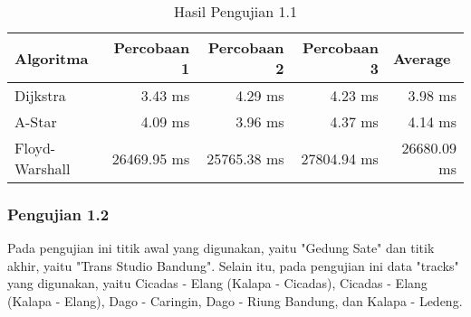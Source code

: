 \renewcommand{\arraystretch}{1.8}
\begin{table}[H]
\centering
\caption{Hasil Pengujian 1.1}
\label{tab:hasiluji1.1}
{\large
\begin{tabular}{|l|r|r|r|r|} 
\hline
{\textbf{Algoritma}} & {\textbf{Percobaan 1}} & {\textbf{Percobaan 2}} & {\textbf{Percobaan 3}} & \multicolumn{1}{l|}{\textbf{Average}} \\ 
\hline
Dijkstra       & 3.43 ms              & 4.29 ms              & 4.23 ms              & 3.98 ms          \\
\hline
A-Star         & 4.09 ms              & 3.96 ms              & 4.37 ms              & 4.14 ms          \\
\hline
Floyd-Warshall & 26469.95 ms          & 25765.38 ms          & 27804.94 ms          & 26680.09 ms \\
\hline
\end{tabular}
}
\end{table}

\subsubsection{Pengujian 1.2}
Pada pengujian ini titik awal yang digunakan, yaitu "Gedung Sate" dan titik akhir, yaitu "Trans Studio Bandung". Selain itu, pada pengujian ini data "tracks" yang digunakan, yaitu Cicadas - Elang (Kalapa - Cicadas), Cicadas - Elang (Kalapa - Elang), Dago - Caringin, Dago - Riung Bandung, dan Kalapa - Ledeng.

\begin{comment}
\begin{table}[H]
\centering
\caption{Data Pengujian 1.2}
\label{tab:data1.2}
{\large
\begin{tabular}{|l|l|}
\hline
\textbf{trackId}       & \textbf{trackName}             \\ \hline
cicadaselangkalapacicadas & Cicadas - Elang (Kalapa - Cicadas) \\ \hline
cicadaselangkalapaelang & Cicadas - Elang (Kalapa - Elang) \\ \hline
dagocaringin   & Dago - Caringin     \\ \hline
dagoriungbandung        & Dago - Riung Bandung             \\ \hline
kalapaledeng        & Kalapa - Ledeng             \\ \hline
\end{tabular}
}
\end{table}
\end{comment}


